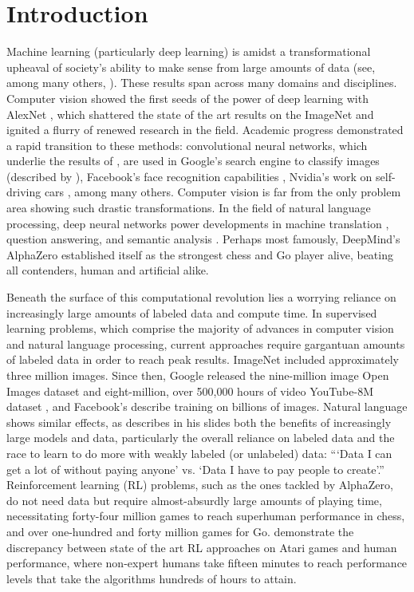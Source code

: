 \chapter{Introduction\label{ch:intro}}

Machine learning (particularly deep learning) is amidst a transformational upheaval of society's ability to make sense from large amounts of data (see, among many others, \cite{Sejnowski2018}). These results span across many domains and disciplines. Computer vision showed the first seeds of the power of deep learning with AlexNet \parencite{Krizhevsky2013} , which shattered the state of the art results on the ImageNet \parencite{Deng2009} and ignited a flurry of renewed research in the field. Academic progress demonstrated a rapid transition to these methods: convolutional neural networks, which underlie the results of \textcite{Krizhevsky2013}, are used in Google's search engine to classify images (described by \cite{Marr2017}), Facebook's face recognition capabilities \parencite{Taigman2014}, Nvidia's work on self-driving cars \parencite{Bojarski2016}, among many others. Computer vision is far from the only problem area showing such drastic transformations. In the field of natural language processing, deep neural networks power developments in machine translation \parencite{Wu2016a}, question answering, and semantic analysis \parencite{Devlin2018a}. Perhaps most famously, DeepMind's AlphaZero \parencite{Silver2018} established itself as the strongest chess and Go player alive, beating all contenders, human and artificial alike.  

Beneath the surface of this computational revolution lies a worrying reliance on increasingly large amounts of labeled data and compute time. In supervised learning problems, which comprise the majority of advances in computer vision and natural language processing, current approaches require gargantuan amounts of labeled data in order to reach peak results. ImageNet \parencite{Deng2009} included approximately three million images. Since then, Google released the nine-million image Open Images dataset \parencite{Kuznetsova2018} and eight-million, over 500,000 hours of video YouTube-8M dataset \parencite{Abu-El-Haija2016}, and Facebook's \textcite{Mahajan2018} describe training on billions of images. Natural language shows similar effects, as \textcite{Devlin2018} describes in his slides both the benefits of increasingly large models and data, particularly the overall reliance on labeled data and the race to learn to do more with weakly labeled (or unlabeled) data: ```Data I can get a lot of without paying anyone' vs. `Data I have to pay people to create'.'' Reinforcement learning (RL) problems, such as the ones tackled by AlphaZero, do not need data but require almost-absurdly large amounts of playing time, necessitating forty-four million games to reach superhuman performance in chess, and over one-hundred and forty million games for Go. \textcite{Lake2017} demonstrate the discrepancy between state of the art RL approaches on Atari games and human performance, where non-expert humans take fifteen minutes to reach performance levels that take the algorithms hundreds of hours to attain. 
 
